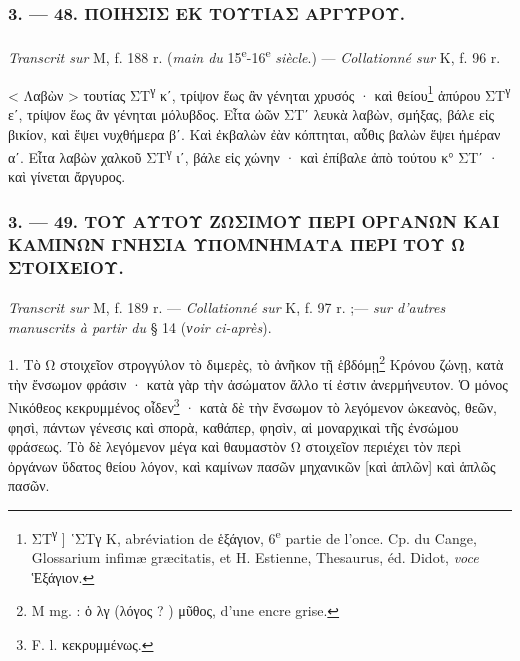 \documentclass[landscape, a4paper, 11pt, oneside, polutonikogreek, french]{article}
\begin{document}
\bigskip
\centerline{\EightStarTaper}
\centerline{\EightStarTaper\EightStarTaper}
\bigskip

\subsubsection{3. --- 48. ΠΟΙΗΣΙΣ ΕΚ ΤΟΥΤΙΑΣ ΑΡΓΥΡΟΥ.}
\paragraph{}
\emph{Transcrit sur} M, f. 188 r. (\emph{main du} 15\textsuperscript{e}-16\textsuperscript{e} \emph{siècle}.) --- \emph{Collationné sur} K, f. 96 r.

\bigskip

< Λαβὼν > τουτίας ΣΤ\textsuperscript{γ} κʹ, τρίψον ἕως ἂν γένηται χρυσός · καὶ θείου\footnote{ΣΤ\textsuperscript{γ} ] ῾ΣΤγ K, abréviation de ἑξάγιον, 6\textsuperscript{e} partie de l'once. Cp. du Cange, Glossarium infimæ græcitatis, et H. Estienne, Thesaurus, éd. Didot, \emph{voce} Ἑξάγιον.} ἀπύρου ΣΤ\textsuperscript{γ} εʹ, τρίψον ἕως ἂν γένηται μόλυβδος. Εἶτα ὠῶν ΣΤʹ λευκὰ λαβὼν, σμήξας, βάλε εἰς βικίον, καὶ ἕψει νυχθήμερα βʹ. Καὶ ἐκβαλὼν ἐὰν κόπτηται, αὖθις βαλὼν ἕψει ἡμέραν αʹ. Εἶτα λαβὼν χαλκοῦ ΣΤ\textsuperscript{γ} ιʹ, βάλε εἰς χώνην · καὶ ἐπίβαλε ἀπὸ τούτου κ° ΣΤʹ · καὶ γίνεται ἄργυρος.
\clearpage
\bigskip
\centerline{\EightStarTaper}
\centerline{\EightStarTaper\EightStarTaper}
\bigskip

\subsubsection{3. --- 49. ΤΟΥ ΑΥΤΟΥ ΖΩΣΙΜΟΥ ΠΕΡΙ ΟΡΓΑΝΩΝ ΚΑΙ ΚΑΜΙΝΩΝ ΓΝΗΣΙΑ ΥΠΟΜΝΗΜΑΤΑ ΠΕΡΙ ΤΟΥ Ω ΣΤΟΙΧΕΙΟΥ.}
\paragraph{}
\emph{Transcrit sur} M, f. 189 r. --- \emph{Collationné sur} K, f. 97 r. ;--- \emph{sur d'autres manuscrits à partir du} § 14 (\emph{νoir ci-après}).

\bigskip

1. Τὸ Ω στοιχεῖον στρογγύλον τὸ διμερὲς, τὸ ἀνῆκον τῇ ἑβδόμῃ\footnote{M mg. : ὁ λγ (λόγος ? ) μῦθος, d'une encre grise.} Κρόνου ζώνῃ, κατὰ τὴν ἔνσωμον φράσιν · κατὰ γὰρ τὴν ἀσώματον ἄλλο τί ἐστιν ἀνερμήνευτον. Ὁ μόνος Νικόθεος κεκρυμμένος οἶδεν\footnote{F. l. κεκρυμμένως.} · κατὰ δὲ τὴν ἔνσωμον τὸ λεγόμενον ὠκεανὸς, θεῶν, φησὶ, πάντων γένεσις καὶ σπορὰ, καθάπερ, φησὶν, αἱ μοναρχικαὶ τῆς ἐνσώμου φράσεως. Τὸ δὲ λεγόμενον μέγα καὶ θαυμαστὸν Ω στοιχεῖον περιέχει τὸν περὶ ὀργάνων ὕδατος θείου λόγον, καὶ καμίνων πασῶν μηχανικῶν [καὶ ἁπλῶν] καὶ ἁπλῶς πασῶν.
\end{document}

